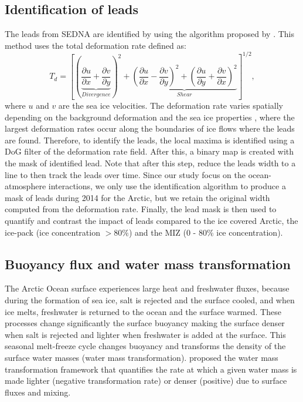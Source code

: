 \documentclass[lineno,sn-basic]{sn-jnl}%
\begin{document}
\subsection*{Identification of leads}

The leads from SEDNA are identified by using the algorithm proposed by \citet{Hutter_identification_2019}. This method uses the total deformation rate defined as: 
\begin{equation}
    T_d = \left[\left(\underbrace{\frac{\partial u}{\partial x} +\frac{\partial v}{\partial y}}_{Divergence}\right)^2 + \underbrace{\left(\frac{\partial u}{\partial x} - \frac{\partial v}{\partial y}\right)^2+ \left(\frac{\partial u}{\partial y} + \frac{\partial v}{\partial x}\right)^2}_{Shear}\right]^{1/2},
\end{equation}
where $u$ and $v$ are the sea ice velocities. The deformation rate varies spatially depending on the background deformation and the sea ice properties \citep{Reiser_LKF_2020}, where the largest deformation rates occur along the boundaries of ice flows where the leads are found. Therefore, to identify the leads, the local maxima is identified using a DoG filter of the deformation rate field. After this, a binary map is created with the mask of identified lead. Note that after this step, \citet{Hutter_identification_2019} reduce the leads width to a line to then track the leads over time. Since our study focus on the ocean-atmosphere interactions, we only use the identification algorithm to produce a mask of leads during 2014 for the Arctic, but we retain the original width computed from the deformation rate. Finally, the lead mask is then used to quantify and contrast the impact of leads compared to the ice covered Arctic, the ice-pack (ice concentration $> 80\%$) and the MIZ (0 - 80\% ice concentration).

\subsection*{Buoyancy flux and water mass transformation}
 
The Arctic Ocean surface experiences large heat and freshwater fluxes, because during the formation of sea ice, salt is rejected and the surface cooled, and when ice melts, freshwater is returned to the ocean and the surface warmed. 
These processes change significantly the surface buoyancy making the surface denser when salt is rejected and lighter when freshwater is added at the surface. This seasonal melt-freeze cycle changes buoyancy and transforms the density of the surface water masses (water mass transformation). \citet{Walin_WMT_1982} proposed the water mass transformation framework that quantifies the rate at which a given water mass is made lighter (negative transformation rate) or denser (positive) due to surface fluxes and mixing. 
\end{document}
